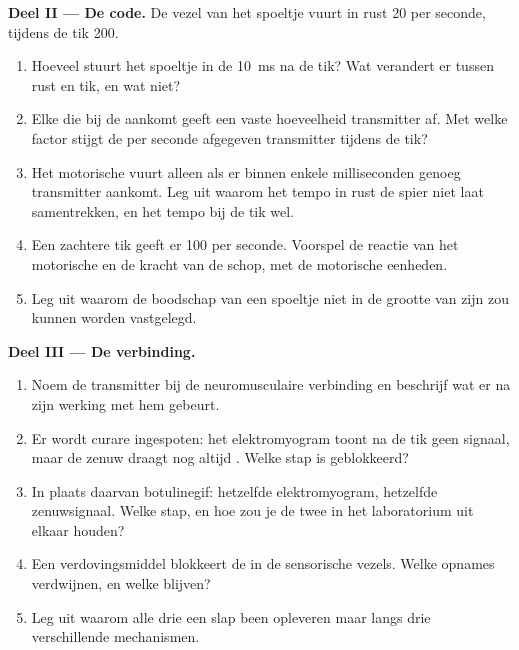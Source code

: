 \begin{problem}
\medskip
\noindent\textbf{Deel II --- De code.}
De vezel van het spoeltje vuurt in rust 20  per seconde,
tijdens de tik 200.
\begin{enumerate}[resume]
  \item Hoeveel  stuurt het spoeltje in de \qty{10}{ms} na
        de tik? Wat verandert er tussen rust en tik, en wat niet?
  \item Elke  die bij de  aankomt geeft een vaste
        hoeveelheid transmitter af. Met welke factor stijgt de per seconde
        afgegeven transmitter tijdens de tik?
  \item Het motorische  vuurt alleen als er binnen enkele
        milliseconden genoeg transmitter aankomt. Leg uit waarom het tempo
        in rust de spier niet laat samentrekken, en het tempo bij de tik
        wel.
  \item Een zachtere tik geeft er 100 per seconde. Voorspel de reactie van
        het motorische  en de kracht van de schop, met de motorische
        eenheden.
  \item Leg uit waarom de boodschap van een spoeltje niet in de grootte van
        zijn  zou kunnen worden vastgelegd.
\end{enumerate}

\medskip
\noindent\textbf{Deel III --- De verbinding.}
\begin{enumerate}[resume]
  \item Noem de transmitter bij de neuromusculaire verbinding en beschrijf
        wat er na zijn werking met hem gebeurt.
  \item Er wordt curare ingespoten: het elektromyogram toont na de tik geen
        signaal, maar de zenuw draagt nog altijd . Welke
        stap is geblokkeerd?
  \item In plaats daarvan botulinegif: hetzelfde elektromyogram, hetzelfde
        zenuwsignaal. Welke stap, en hoe zou je de twee in het laboratorium
        uit elkaar houden?
  \item Een verdovingsmiddel blokkeert de  in de
        sensorische vezels. Welke opnames verdwijnen, en welke blijven?
  \item Leg uit waarom alle drie een slap been opleveren maar langs drie
        verschillende mechanismen.
\end{enumerate}


\end{problem}
